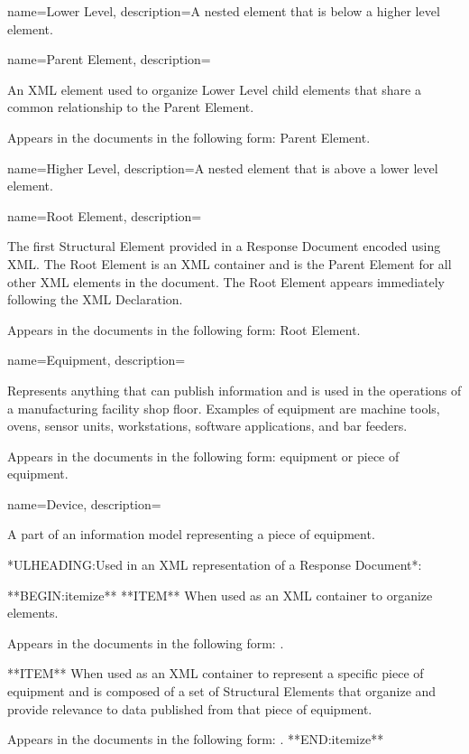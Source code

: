 {
    name={Lower Level},
	description={A nested element that is below a higher level element.}
}

{
    name={Parent Element},
	description={
	An XML element used to organize \gls{Lower Level} child elements that share a common relationship to the \gls{Parent Element}.

	Appears in the documents in the following form: \gls{Parent Element}.
}
}

{
    name={Higher Level},
	description={A nested element that is above a lower level element.}
}

{
    name={Root Element},
	description={
	The first \gls{Structural Element} provided in a \gls{Response Document} encoded using XML.  The \gls{Root Element} is an XML container and is the \gls{Parent Element} for all other XML elements in the document.  The \gls{Root Element} appears immediately following the XML Declaration.

	Appears in the documents in the following form: \gls{Root Element}.
}
}

{
    name={Equipment},
	description={
	Represents anything that can publish information and is used in the operations of a manufacturing facility shop floor.  Examples of equipment are machine tools, ovens, sensor units, workstations, software applications, and bar feeders.

	Appears in the documents in the following form: equipment or piece of equipment.
}
}

{
    name={Device},
	description={
	A part of an information model representing a piece of equipment.  
	
	*ULHEADING:Used in an XML representation of a \gls{Response Document}*:

    **BEGIN:itemize**
	**ITEM** When used as an XML container to organize  elements.

	Appears in the documents in the following form: .

	**ITEM** When used as an XML container to represent a specific piece of equipment and is composed of a set of \gls{Structural Elements} that organize and provide relevance to data published from that piece of equipment.

	Appears in the documents in the following form: .
	**END:itemize**
}
}

